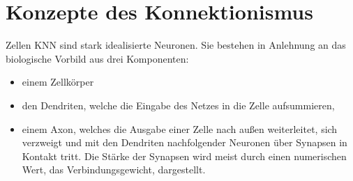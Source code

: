 \section*{Konzepte des Konnektionismus}
Zellen KNN sind stark idealisierte Neuronen.
Sie bestehen in Anlehnung an das biologische Vorbild aus drei Komponenten:
\begin{itemize}[noitemsep]
\item einem Zellkörper
\item den Dendriten, welche die Eingabe des Netzes in die Zelle
aufsummieren, 
\item einem Axon, welches die Ausgabe einer Zelle nach außen
weiterleitet, sich verzweigt und mit den Dendriten nachfolgender Neuronen
über Synapsen in Kontakt tritt. Die Stärke der Synapsen wird meist durch einen
numerischen Wert, das Verbindungsgewicht, dargestellt.
\end{itemize}

